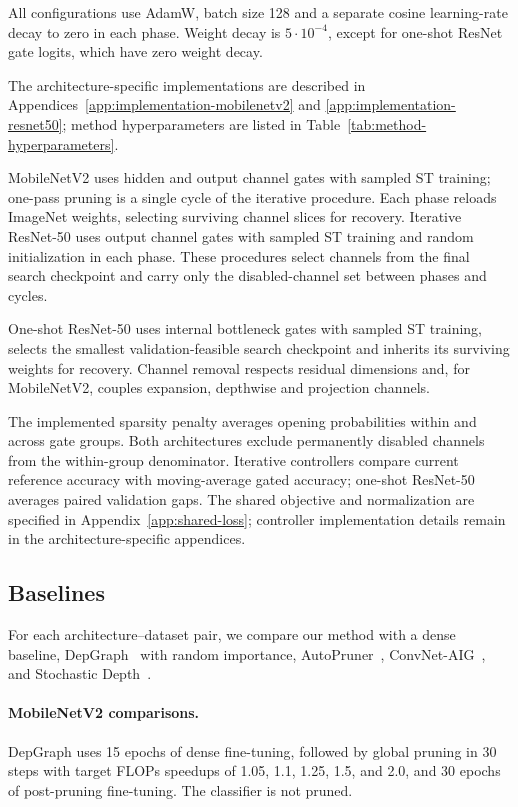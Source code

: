 \documentclass[sigplan,screen]{acmart}
\begin{document}
All configurations use AdamW, batch size 128 and a
separate cosine learning-rate decay to zero in each phase. Weight
decay is $5\cdot10^{-4}$, except for one-shot ResNet gate logits, which have
zero weight decay.

The architecture-specific implementations are described in
Appendices~\ref{app:implementation-mobilenetv2} and
\ref{app:implementation-resnet50}; method hyperparameters are listed in
Table~\ref{tab:method-hyperparameters}.

MobileNetV2 uses hidden and output channel gates with sampled ST training;
one-pass pruning is a single cycle of the iterative procedure. Each phase
reloads ImageNet weights, selecting surviving channel slices for recovery.
Iterative ResNet-50 uses output channel gates with sampled ST training and
random initialization in each phase. These procedures select channels
from the final search checkpoint and carry only the disabled-channel set
between phases and cycles.

One-shot ResNet-50 uses internal bottleneck gates with sampled ST
training, selects the smallest validation-feasible search checkpoint and
inherits its surviving weights for recovery. Channel removal respects
residual dimensions and, for MobileNetV2, couples expansion, depthwise
and projection channels.

The implemented sparsity penalty averages opening probabilities within
and across gate groups. Both architectures exclude permanently disabled
channels from the within-group denominator.
Iterative controllers compare current reference accuracy with moving-average
gated accuracy; one-shot ResNet-50 averages paired validation gaps.
The shared objective and normalization are specified in
Appendix~\ref{app:shared-loss}; controller implementation details remain
in the architecture-specific appendices.

\subsection{Baselines}

For each architecture--dataset pair, we compare our method with a dense
baseline, DepGraph~\cite{fang2023depgraph} with random importance,
AutoPruner~\cite{luo2020autopruner}, ConvNet-AIG~\cite{veit2018convnet},
and Stochastic Depth~\cite{huang2016deep}.

\paragraph{MobileNetV2 comparisons.}
DepGraph uses 15 epochs of dense fine-tuning, followed by global pruning
in 30 steps with target FLOPs speedups of 1.05, 1.1, 1.25, 1.5, and 2.0,
and 30 epochs of post-pruning fine-tuning. The classifier is not pruned.
\end{document}
